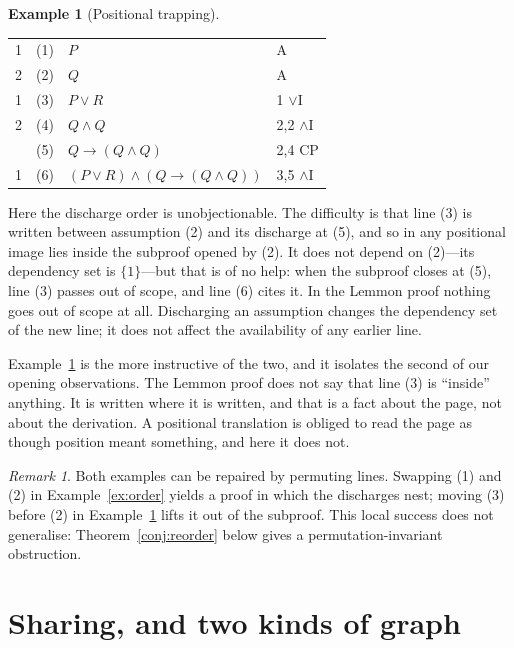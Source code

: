 \documentclass[11pt]{article}
\makeatletter
\theoremstyle{plain}
\theoremstyle{definition}
\newtheorem{example}[theorem]{Example}
\theoremstyle{remark}
\newtheorem{remark}[theorem]{Remark}
\newcommand{\dep}[1]{\textup{#1}}
\newenvironment{lemmonproof}
  {\begin{center}\begin{tabular}{@{}r@{\hspace{1.5em}}r@{\hspace{0.6em}}l@{\hspace{2.5em}}l@{}}}
  {\end{tabular}\end{center}}
\makeatother
\begin{document}
\begin{example}[Positional trapping]\label{ex:trap}
\begin{lemmonproof}
\dep{1} & (1) & $P$                                     & A \\
\dep{2} & (2) & $Q$                                     & A \\
\dep{1} & (3) & $P \vee R$                              & 1 $\vee$I \\
\dep{2} & (4) & $Q \wedge Q$                            & 2,2 $\wedge$I \\
        & (5) & $Q \to (Q \wedge Q)$                    & 2,4 CP \\
\dep{1} & (6) & $(P \vee R) \wedge (Q \to (Q \wedge Q))$ & 3,5 $\wedge$I \\
\end{lemmonproof}
\end{example}

\noindent Here the discharge order is unobjectionable. The difficulty is that
line (3) is written between assumption (2) and its discharge at (5), and so in
any positional image lies inside the subproof opened by (2). It does not
depend on (2)---its dependency set is $\{1\}$---but that is of no help: when
the subproof closes at (5), line (3) passes out of scope, and line (6) cites
it. In the Lemmon proof nothing goes out of scope at all. Discharging an
assumption changes the dependency set of the new line; it does not affect the
availability of any earlier line.

Example~\ref{ex:trap} is the more instructive of the two, and it isolates the
second of our opening observations. The Lemmon proof does not say that line
(3) is ``inside'' anything. It is written where it is written, and that is a
fact about the page, not about the derivation. A positional translation is
obliged to read the page as though position meant something, and here it does
not.

\begin{remark}
Both examples can be repaired by permuting lines. Swapping (1) and (2) in
Example~\ref{ex:order} yields a proof in which the discharges nest; moving (3)
before (2) in Example~\ref{ex:trap} lifts it out of the subproof. This local
success does not generalise: Theorem~\ref{conj:reorder} below gives a
permutation-invariant obstruction.
\end{remark}

\section{Sharing, and two kinds of graph}\label{sec:trees}
\end{document}
